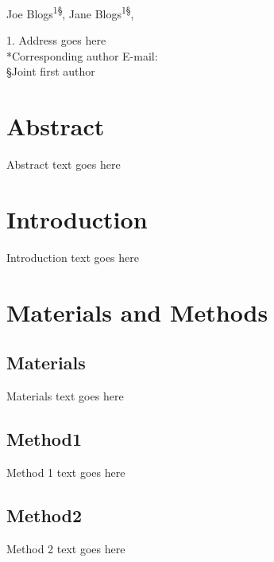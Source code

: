 \documentclass[11pt,a4]{article}
\begin{document}
\vspace*{0.35in}

\begin{center}
{\Huge
\textbf
{}
}
\newline
\newline

\Large
Joe Blogs\textsuperscript{1§},
Jane Blogs\textsuperscript{1§},

\end{center}

\begin{flushleft}
\bigskip
{1.} Address goes here\\
\bigskip
*Corresponding author E-mail: \\
§Joint first author
\end{flushleft}
\newpage
\section*{Abstract}
\begin{justify}
Abstract text goes here
\end{justify}

\linenumbers

\section*{Introduction}
\begin{justify}
Introduction text goes here

\end{justify}

\section*{Materials and Methods}

\subsection*{Materials} 
 Materials text goes here
 
\subsection*{Method1}  
Method 1 text goes here

\subsection*{Method2}
Method 2 text goes here
\end{document}
